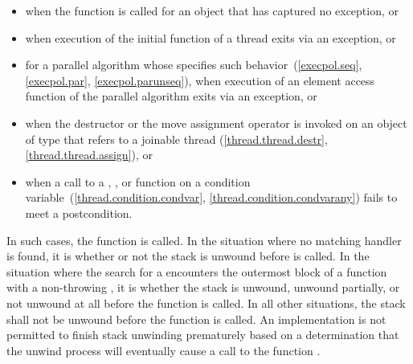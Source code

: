 \begin{note}
\begin{itemize}
\item%
when the function  is called for an object
that has captured no exception, or

\item%
when execution of the initial function of a thread exits via
an exception, or

\item%
for a parallel algorithm whose  specifies such
behavior~(\ref{execpol.seq}, \ref{execpol.par}, \ref{execpol.parunseq}),
when execution of an element access function
of the parallel algorithm exits via an exception, or

\item%
when the destructor or the move assignment operator is invoked on an object
of type  that refers to a joinable thread
(\ref{thread.thread.destr}, \ref{thread.thread.assign}), or

\item%
when a call to a , , or 
function on a condition variable~(\ref{thread.condition.condvar}, \ref{thread.condition.condvarany})
fails to meet a postcondition.

\end{itemize}

\end{note}

\pnum
{}%
In such cases,
the function 
is called.
In the situation where no matching handler is found, it is
 whether or not the
stack is unwound
before
is called.
In the situation where the search for a  encounters the
outermost block of a function
with a non-throwing , it is
whether the stack is unwound, unwound partially, or not unwound at all
before the function  is called.
In all other situations, the stack shall not be unwound before
the function 
is called.
An implementation is not permitted to finish stack unwinding
prematurely based on a determination that the unwind process
will eventually cause a call to the function
.

